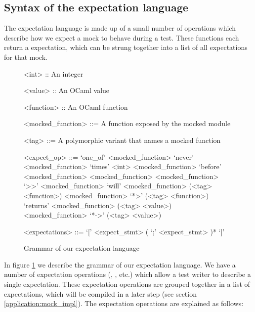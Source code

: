 \subsection{Syntax of the expectation language}
\label{application:syntax}

The expectation language is made up of a small number of operations
which describe how we expect a mock to behave during a test. These
functions each return a expectation, which can be strung together into
a list of all expectations for that mock.

\begin{figure}
  \begin{grammar}
    <int> :: An integer

    <value> :: An OCaml value

    <function> :: An OCaml function

    <mocked\_function> ::= A function exposed by the mocked module

    <tag> ::= A polymorphic variant that names a mocked function

    <expect\_op> ::=
    `one\_of' <mocked\_function>
    \alt `never' <mocked\_function>
    \alt `times' <int> <mocked\_function>
    \alt `before' <mocked\_function> <mocked\_function>
    \alt <mocked\_function> `>>' <mocked\_function>
    \alt `will' <mocked\_function> (<tag> <function>)
    \alt  <mocked\_function> `*>' (<tag> <function>)
    \alt `returns' <mocked\_function> (<tag> <value>)
    \alt <mocked\_function> `*->' (<tag> <value>)

    <expectations> ::= `[' <expect\_stmt> ( `;' <expect\_stmt> )* `]'
  \end{grammar}

  \caption{Grammar of our expectation language}
  \label{code:syntax}
\end{figure}

In figure \ref{code:syntax} we describe the grammar of our expectation
language. We have a number of expectation operations (,
, etc.) which allow a test writer to describe a single
expectation. These expectation operations are grouped together in a
list of expectations, which will be compiled in a later step (see
section \ref{application:mock_impl}). The expectation operations are
explained as follows:

